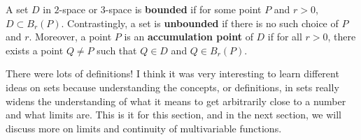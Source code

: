 \documentclass[../../../main.tex]{subfiles}
\begin{document}
\begin{definition}{}{}
A set $D$ in $2$-space or $3$-space is \textbf{bounded} if for some
point $P$ and $r > 0$, $D \subset B_r(P)$. Contrastingly, a set is
\textbf{unbounded} if there is no such choice of $P$ and $r$.
Moreover, a point $P$ is an \textbf{accumulation point} of $D$
if for all $r > 0$, there exists a point $Q \neq P$ such that
$Q \in D$ and $Q \in B_r(P)$.
\end{definition}

There were lots of definitions! I think it was very interesting
to learn different ideas on sets because understanding the concepts,
or definitions, in sets really widens the understanding of what it
means to get arbitrarily close to a number and what limits are.
This is it for this section, and in the next section, we will discuss
more on limits and continuity of multivariable functions.
\end{document}

